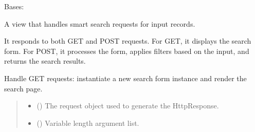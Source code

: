\documentclass[letterpaper,10pt,english]{sphinxmanual}
\begin{document}

\begin{fulllineitems}
\label{\detokenize{source/meta_models_management:meta_models_management.views.SmartSearch}}
\pysigstartsignatures
{}
\pysigstopsignatures
\sphinxAtStartPar
Bases: 

\sphinxAtStartPar
A view that handles smart search requests for input records.

\sphinxAtStartPar
It responds to both GET and POST requests. For GET, it displays the search form.
For POST, it processes the form, applies filters based on the input, and returns the search results.

\begin{fulllineitems}
\label{\detokenize{source/meta_models_management:meta_models_management.views.SmartSearch.get}}
\pysigstartsignatures
{}
\pysigstopsignatures
\sphinxAtStartPar
Handle GET requests: instantiate a new search form instance and render the search page.
\begin{quote}\begin{description}
\begin{itemize}
\item {} 
\sphinxAtStartPar
{} () \textendash{} The request object used to generate the HttpResponse.

\item {} 
\sphinxAtStartPar
{} () \textendash{} Variable length argument list.


\end{itemize}
\end{description}
\end{quote}
\end{fulllineitems}
\end{fulllineitems}
\end{document}
